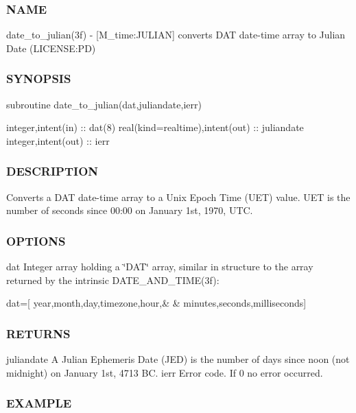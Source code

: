 \subsubsection*{N\+A\+ME}

date\+\_\+to\+\_\+julian(3f) -\/ \mbox{[}M\+\_\+time\+:J\+U\+L\+I\+AN\mbox{]} converts D\+AT date-\/time array to Julian Date (L\+I\+C\+E\+N\+SE\+:PD) 

\subsubsection*{S\+Y\+N\+O\+P\+S\+IS}

\begin{DoxyVerb}subroutine date_to_julian(dat,juliandate,ierr)

 integer,intent(in)               :: dat(8)
 real(kind=realtime),intent(out)  :: juliandate
 integer,intent(out)              :: ierr
\end{DoxyVerb}


\subsubsection*{D\+E\+S\+C\+R\+I\+P\+T\+I\+ON}

Converts a D\+AT date-\/time array to a Unix Epoch Time (U\+ET) value. U\+ET is the number of seconds since 00\+:00 on January 1st, 1970, U\+TC.

\subsubsection*{O\+P\+T\+I\+O\+NS}

dat Integer array holding a \char`\"{}\+D\+A\+T\char`\"{} array, similar in structure to the array returned by the intrinsic D\+A\+T\+E\+\_\+\+A\+N\+D\+\_\+\+T\+I\+M\+E(3f)\+:

dat=\mbox{[} year,month,day,timezone,hour,\& \& minutes,seconds,milliseconds\mbox{]}

\subsubsection*{R\+E\+T\+U\+R\+NS}

juliandate A Julian Ephemeris Date (J\+ED) is the number of days since noon (not midnight) on January 1st, 4713 BC. ierr Error code. If 0 no error occurred.

\subsubsection*{E\+X\+A\+M\+P\+LE}

